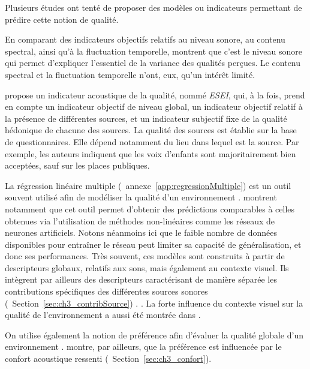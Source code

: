 { 
Plusieurs études ont tenté de proposer des modèles ou indicateurs permettant de prédire cette notion de qualité.

En comparant des indicateurs objectifs relatifs au niveau sonore, au contenu spectral, ainsi qu'à la fluctuation temporelle, \citep{nilsson2006soundscape,nilsson2007acoustic} montrent que c'est le niveau sonore qui permet d'expliquer l'essentiel de la variance des qualités perçues. Le contenu spectral et la fluctuation temporelle n'ont, eux, qu'un intérêt limité.

\citep{garcia2012validation} propose un indicateur acoustique de la qualité, nommé \emph{ESEI}, qui, à la fois, prend en compte un indicateur objectif de niveau global, un indicateur objectif relatif à la présence de différentes sources, et un indicateur subjectif fixe de la qualité hédonique de chacune des sources. La qualité des sources est établie sur la base de questionnaires. Elle dépend notamment du lieu dans lequel est   la source. Par exemple, les auteurs indiquent que les voix d'enfants sont majoritairement bien acceptées, sauf sur les places publiques.

La régression linéaire multiple (\cf~annexe~\ref{app:regressionMultiple}) est un outil souvent utilisé afin de modéliser la qualité d'un environnement \citep{ricciardi2015sound}. \citep{brocolini2012prediction} montrent notamment que cet outil permet d'obtenir des prédictions comparables à celles obtenues via l'utilisation de méthodes non-linéaires comme les réseaux de neurones artificiels. Notons néanmoins ici que le faible nombre de données disponibles pour entraîner le réseau peut limiter sa capacité de généralisation, et donc ses performances. Très souvent, ces modèles sont construits à partir de descripteurs globaux, relatifs aux sons, mais également au contexte visuel. Ils intègrent par ailleurs des descripteurs caractérisant de manière séparée les contributions spécifiques des différentes sources sonores (\cf~Section~\ref{sec:ch3_contribSource}) \citep{ricciardi2015sound,brocolini2012prediction}. . La forte influence du contexte visuel sur la qualité de l'environnement a aussi été montrée dans \citep{hong2013designing}.

On utilise également la notion de préférence afin d'évaluer la qualité globale d'un environnement \citep{yu2010factors}. \citep{hong2013designing} montre, par ailleurs, que la préférence est influencée par le confort acoustique ressenti (\cf~Section~\ref{sec:ch3_confort}).\\

}
